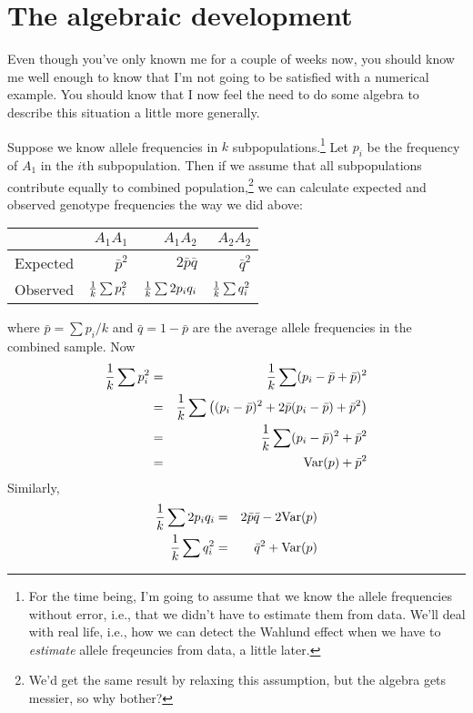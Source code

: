 \section*{The algebraic development}

Even though you've only known me for a couple of weeks now, you should
know me well enough to know that I'm not going to be satisfied with a
numerical example. You should know that I now feel the need to do some
algebra to describe this situation a little more generally.

Suppose we know allele frequencies in $k$ subpopulations.\footnote{For
  the time being, I'm going to assume that we know the allele
  frequencies without error, i.e., that we didn't have to estimate
  them from data. We'll deal with real life, i.e., how we can detect
  the Wahlund effect when we have to {\it estimate\/} allele
  freqeuncies from data, a little later.} Let $p_i$ be the frequency
of $A_1$ in the $i$th subpopulation. Then if we assume that all
subpopulations contribute equally to combined
population,\footnote{We'd get the same result by relaxing this
  assumption, but the algebra gets messier, so why bother?} we can
calculate expected and observed genotype frequencies the way we did
above:

\begin{center}
\begin{tabular}{l|rrr}
\hline\hline
         & $A_1A_1$       & $A_1A_2$         & $A_2A_2$ \\
\hline
Expected & $\bar p^2$     & $2\bar p\bar q$  & $\bar q^2$ \\
Observed & $\frac{1}{k}\sum p_i^2$ & $\frac{1}{k}\sum 2p_iq_i$ & $\frac{1}{k}\sum q_i^2$ \\
\hline
\end{tabular}
\end{center}
where $\bar p = \sum p_i/k$ and $\bar q = 1 - \bar p$ are the average
allele frequencies in the combined sample. Now
\begin{eqnarray}
\frac{1}{k}\sum p_i^2 &=& \frac{1}{k}\sum (p_i - \bar p + \bar p)^2 \\
&=& \frac{1}{k}\sum \left((p_i - \bar p)^2 + 2\bar p(p_i - \bar p)
                            + \bar p^2\right) \\
             &=& \frac{1}{k}\sum (p_i - \bar p)^2 + \bar p^2 \\
             &=& \hbox{Var}(p) + \bar p^2 \label{eq:p2}
\end{eqnarray}
Similarly,
\begin{eqnarray}
\frac{1}{k}\sum 2p_iq_i &=& 2\bar p\bar q - 2\hbox{Var}(p) \label{eq:2pq} \\
\frac{1}{k}\sum q_i^2   &=& \bar q^2 + \hbox{Var}(p) \label{eq:q2}
\end{eqnarray}

